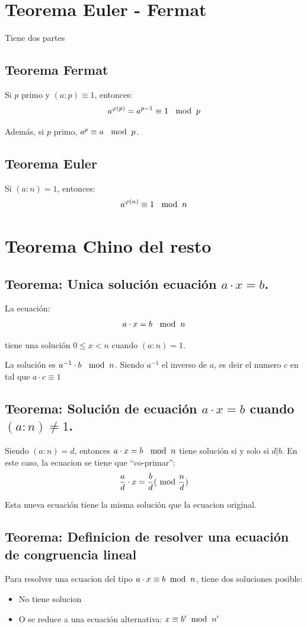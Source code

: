 \documentclass[12pt,a4paper]{report}
\begin{document}
\section{Teorema Euler - Fermat}
Tiene dos partes

\subsection{Teorema Fermat}
Si $p$ primo y $(a : p) \equiv 1$, entonces:
$$
a^{\varphi(p)} = a^{p-1} \equiv 1 \ \; \bmod \; {{p}}
$$

Además, si $p$ primo, $a ^ p \equiv a \ \modulo{p}$.

\subsection{Teorema Euler}
Si $(a : n) = 1$, entonces:
$$a^{\varphi(n)} \equiv 1 \ \modulo{n}$$

\section{Teorema Chino del resto}
\subsection{Teorema: Unica solución ecuación $a \cdot x = b$.}

La ecuación:
$$
a \cdot x = b \ \modulo{n}
$$

tiene una solución $0 \leq x <n$ cuando $(a:n) = 1$.


La solución es $a^{-1} \cdot b \ \modulo{n}$. Siendo $a^{-1}$ el inverso de $a$, es deir el numero $c$ en \cuerpo tal que $a \cdot c \equiv 1$

\subsection{Teorema: Solución de ecuación $a \cdot x = b$ cuando $(a : n) \neq 1$.}

Siendo $(a: n)= d$, entonces $a \cdot x = b \ \; \bmod \; {{n}}$ tiene solución si y solo si $d | b$. En este caso, la ecuacion se tiene que ``co-primar'':
$$
\frac{a}{d} \cdot x = \frac{b}{d} (\; \bmod \; {{\frac{n}{d}}})
$$

Esta nueva ecuación tiene la misma solución que la ecuacion original.

\subsection{Teorema: Definicion de resolver una ecuación de congruencia lineal}
Para resolver una ecuacion del tipo $a \cdot x \equiv b \; \bmod \; {{n}}$, tiene dos soluciones posible:
\begin{itemize}
  \item{No tiene solucion}
  \item{O se reduce a una ecuación alternativa: $x \equiv b' \; \bmod \; {{n'}}$}
\end{itemize}
\end{document}
